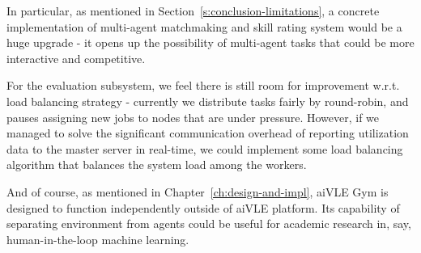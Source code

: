 In particular, as mentioned in Section~\ref{s:conclusion-limitations}, a concrete implementation of multi-agent matchmaking and skill rating system would be a huge upgrade - it opens up the possibility of multi-agent tasks that could be more interactive and competitive.

For the evaluation subsystem, we feel there is still room for improvement w.r.t. load balancing strategy - currently we distribute tasks fairly by round-robin, and pauses assigning new jobs to nodes that are under pressure. However, if we managed to solve the significant communication overhead of reporting utilization data to the master server in real-time, we could implement some load balancing algorithm that balances the system load among the workers.

And of course, as mentioned in Chapter~\ref{ch:design-and-impl}, aiVLE Gym is designed to function independently outside of aiVLE platform. Its capability of separating environment from agents could be useful for academic research in, say, human-in-the-loop machine learning.

